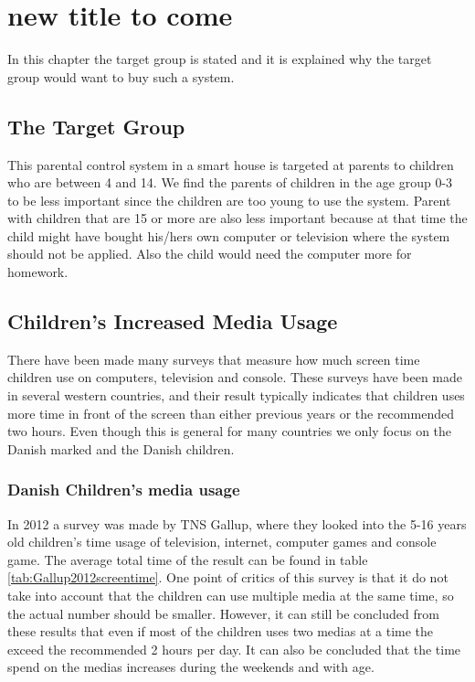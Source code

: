 \chapter{new title to come}
In this chapter the target group is stated and it is explained why the target group would want to buy such a system.
 
\section{The Target Group}
This parental control system in a smart house is targeted at parents to children who are between 4 and 14.
We find the parents of children in the age group 0-3 to be less important since the children are too young to use the system.
Parent with children that are 15 or more are also less important because at that time the child might have bought his/hers own 
computer or television where the system should not be applied. Also the child would need the computer more for homework.  
    

\section{Children's Increased Media Usage}

There have been made many surveys that measure how much screen time children use on computers, television and console. These surveys 
have been made in several western countries, and their result typically indicates that children uses more 
time in front of the screen than either previous years or the recommended two hours. 
Even though this is general for many countries we only focus on the Danish marked and the Danish children.



\subsection{Danish Children's media usage}
In 2012 a survey was made by TNS Gallup, where they looked into the 5-16 years old children's time usage of television, internet, computer games 
and console game. The average total time of the result can be found in table \ref{tab:Gallup2012screentime}. One point of critics of 
this survey is that it do not take into account that the children can use multiple media at the same time, so the actual number 
should be smaller. However, it can still be concluded from these results that even if most of the children uses two medias at a time
the exceed the recommended 2 hours per day. It can also be concluded that the time spend on the medias increases during the weekends and 
with age.

